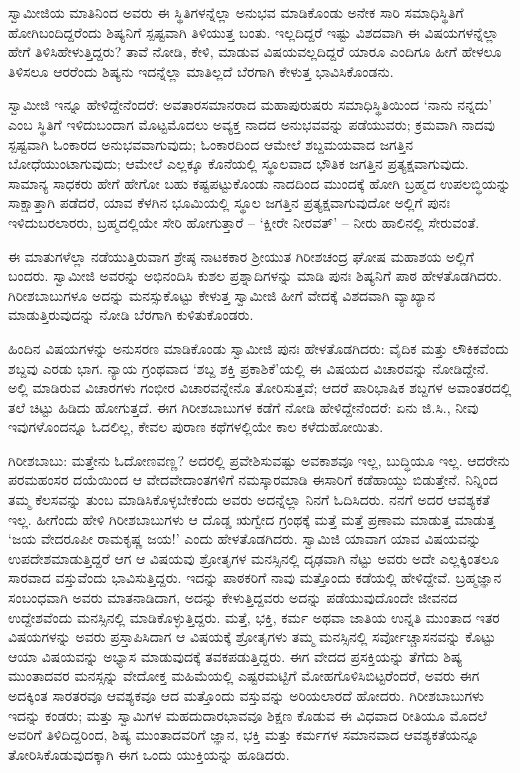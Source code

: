 ಸ್ವಾಮೀಜಿಯ ಮಾತಿನಿಂದ ಅವರು ಈ ಸ್ಥಿತಿಗಳನ್ನೆಲ್ಲಾ ಅನುಭವ ಮಾಡಿಕೊಂಡು ಅನೇಕ ಸಾರಿ ಸಮಾಧಿಸ್ಥಿತಿಗೆ ಹೋಗಿಬಂದಿದ್ದರೆಂದು ಶಿಷ್ಯನಿಗೆ ಸ್ಪಷ್ಟವಾಗಿ ತಿಳಿಯುತ್ತ ಬಂತು. ಇಲ್ಲದಿದ್ದರೆ ಇಷ್ಟು ವಿಶದವಾಗಿ ಈ ವಿಷಯಗಳನ್ನೆಲ್ಲಾ ಹೇಗೆ ತಿಳಿಸಿಹೇಳುತ್ತಿದ್ದರು? ತಾವೆ ನೋಡಿ, ಕೇಳಿ, ಮಾಡುವ ವಿಷಯವಲ್ಲದಿದ್ದರೆ ಯಾರೂ ಎಂದಿಗೂ ಹೀಗೆ ಹೇಳಲೂ ತಿಳಿಸಲೂ ಆರರೆಂದು ಶಿಷ್ಯನು ಇದನ್ನೆಲ್ಲಾ ಮಾತಿಲ್ಲದೆ ಬೆರಗಾಗಿ ಕೇಳುತ್ತ ಭಾವಿಸಿಕೊಂಡನು.

ಸ್ವಾಮೀಜಿ ಇನ್ನೂ ಹೇಳಿದ್ದೇನೆಂದರೆ: ಅವತಾರಸಮಾನರಾದ ಮಹಾಪುರುಷರು ಸಮಾಧಿಸ್ಥಿತಿಯಿಂದ ‘ನಾನು ನನ್ನದು’ ಎಂಬ ಸ್ಥಿತಿಗೆ ಇಳಿದುಬಂದಾಗ ಮೊಟ್ಟಮೊದಲು ಅವ್ಯಕ್ತ ನಾದದ ಅನುಭವವನ್ನು ಪಡೆಯುವರು; ಕ್ರಮವಾಗಿ ನಾದವು ಸ್ಪಷ್ಟವಾಗಿ ಓಂಕಾರದ ಅನುಭವವಾಗುವುದು; ಓಂಕಾರದಿಂದ ಆಮೇಲೆ ಶಬ್ದಮಯವಾದ ಜಗತ್ತಿನ ಬೋಧೆಯುಂಟಾಗುವುದು; ಆಮೇಲೆ ಎಲ್ಲಕ್ಕೂ ಕೊನೆಯಲ್ಲಿ ಸ್ಥೂಲವಾದ ಭೌತಿಕ ಜಗತ್ತಿನ ಪ್ರತ್ಯಕ್ಷವಾಗುವುದು. ಸಾಮಾನ್ಯ ಸಾಧಕರು ಹೇಗೆ ಹೇಗೋ ಬಹು ಕಷ್ಟಪಟ್ಟುಕೊಂಡು ನಾದದಿಂದ ಮುಂದಕ್ಕೆ ಹೋಗಿ ಬ್ರಹ್ಮದ ಉಪಲಬ್ಧಿಯನ್ನು ಸಾಕ್ಷಾತ್ತಾಗಿ ಪಡೆದರೆ, ಯಾವ ಕೆಳಗಿನ ಭೂಮಿಯಲ್ಲಿ ಸ್ಥೂಲ ಜಗತ್ತಿನ ಪ್ರತ್ಯಕ್ಷವಾಗುವುದೋ ಅಲ್ಲಿಗೆ ಪುನಃ ಇಳಿದುಬರಲಾರರು, ಬ್ರಹ್ಮದಲ್ಲಿಯೇ ಸೇರಿ ಹೋಗುತ್ತಾರೆ – ‘ಕ್ಷೀರೇ ನೀರವತ್’ – ನೀರು ಹಾಲಿನಲ್ಲಿ ಸೇರುವಂತೆ.

ಈ ಮಾತುಗಳೆಲ್ಲಾ ನಡೆಯುತ್ತಿರುವಾಗ ಶ್ರೇಷ್ಠ ನಾಟಕಕಾರ ಶ‍್ರೀಯುತ ಗಿರೀಶಚಂದ್ರ ಘೋಷ ಮಹಾಶಯ ಅಲ್ಲಿಗೆ ಬಂದರು. ಸ್ವಾಮೀಜಿ ಅವರನ್ನು ಅಭಿನಂದಿಸಿ ಕುಶಲ ಪ್ರಶ್ನಾದಿಗಳನ್ನು ಮಾಡಿ ಪುನಃ ಶಿಷ್ಯನಿಗೆ ಪಾಠ ಹೇಳತೊಡಗಿದರು. ಗಿರೀಶಬಾಬುಗಳೂ ಅದನ್ನು ಮನಸ್ಸುಕೊಟ್ಟು ಕೇಳುತ್ತ ಸ್ವಾಮೀಜಿ ಹೀಗೆ ವೇದಕ್ಕೆ ವಿಶದವಾಗಿ ವ್ಯಾಖ್ಯಾನ ಮಾಡುತ್ತಿರುವುದನ್ನು ನೋಡಿ ಬೆರಗಾಗಿ ಕುಳಿತುಕೊಂಡರು.

ಹಿಂದಿನ ವಿಷಯಗಳನ್ನು ಅನುಸರಣ ಮಾಡಿಕೊಂಡು ಸ್ವಾಮೀಜಿ ಪುನಃ ಹೇಳತೊಡಗಿದರು: ವೈದಿಕ ಮತ್ತು ಲೌಕಿಕವೆಂದು ಶಬ್ದವು ಎರಡು ಭಾಗ. ನ್ಯಾಯ ಗ್ರಂಥವಾದ ‘ಶಬ್ದ ಶಕ್ತಿ ಪ್ರಕಾಶಿಕೆ’ಯಲ್ಲಿ ಈ ವಿಷಯದ ವಿಚಾರವನ್ನು ನೋಡಿದ್ದೇನೆ. ಅಲ್ಲಿ ಮಾಡಿರುವ ವಿಚಾರಗಳು ಗಂಭೀರ ವಿಚಾರವನ್ನೇನೊ ತೋರಿಸುತ್ತವೆ; ಆದರೆ ಪಾರಿಭಾಷಿಕ ಶಬ್ದಗಳ ಅವಾಂತರದಲ್ಲಿ ತಲೆ ಚಿಟ್ಟು ಹಿಡಿದು ಹೋಗುತ್ತದೆ. ಈಗ ಗಿರೀಶಬಾಬುಗಳ ಕಡೆಗೆ ನೋಡಿ ಹೇಳಿದ್ದೇನೆಂದರೆ: ಏನು ಜಿ.ಸಿ., ನೀವು ಇವುಗಳೊಂದನ್ನೂ ಓದಲಿಲ್ಲ, ಕೇವಲ ಪುರಾಣ ಕಥೆಗಳಲ್ಲಿಯೇ ಕಾಲ ಕಳೆದುಹೋಯಿತು.

ಗಿರೀಶಬಾಬು: ಮತ್ತೇನು ಓದೋಣವಣ್ಣ? ಅದರಲ್ಲಿ ಪ್ರವೇಶಿಸುವಷ್ಟು ಅವಕಾಶವೂ ಇಲ್ಲ, ಬುದ್ಧಿಯೂ ಇಲ್ಲ. ಆದರೇನು ಪರಮಹಂಸರ ದಯೆಯಿಂದ ಆ ವೇದವೇದಾಂತಗಳಿಗೆ ನಮಸ್ಕಾರಮಾಡಿ ಈಸಾರಿಗೆ ಕಡೆಹಾಯ್ದು ಬಿಡುತ್ತೇನೆ. ನಿನ್ನಿಂದ ತಮ್ಮ ಕೆಲಸವನ್ನು ತುಂಬ ಮಾಡಿಸಿಕೊಳ್ಳಬೇಕೆಂದು ಅವರು ಅದನ್ನೆಲ್ಲಾ ನಿನಗೆ ಓದಿಸಿದರು. ನನಗೆ ಅದರ ಆವಶ್ಯಕತೆ ಇಲ್ಲ. ಹೀಗೆಂದು ಹೇಳಿ ಗಿರೀಶಬಾಬುಗಳು ಆ ದೊಡ್ಡ ಋಗ್ವೇದ ಗ್ರಂಥಕ್ಕೆ ಮತ್ತೆ ಮತ್ತೆ ಪ್ರಣಾಮ ಮಾಡುತ್ತ ಮಾಡುತ್ತ ‘ಜಯ ವೇದರೂಪೀ ರಾಮಕೃಷ್ಣ ಜಯ!’ ಎಂದು ಹೇಳತೊಡಗಿದರು. ಸ್ವಾಮಿಜಿ ಯಾವಾಗ ಯಾವ ವಿಷಯವನ್ನು ಉಪದೇಶಮಾಡುತ್ತಿದ್ದರೆ ಆಗ ಆ ವಿಷಯವು ಶ್ರೋತೃಗಳ ಮನಸ್ಸಿನಲ್ಲಿ ದೃಢವಾಗಿ ನೆಟ್ಟು ಅವರು ಅದೇ ಎಲ್ಲಕ್ಕಿಂತಲೂ ಸಾರವಾದ ವಸ್ತುವೆಂದು ಭಾವಿಸುತ್ತಿದ್ದರು. ಇದನ್ನು ಪಾಠಕರಿಗೆ ನಾವು ಮತ್ತೊಂದು ಕಡೆಯಲ್ಲಿ ಹೇಳಿದ್ದೇವೆ. ಬ್ರಹ್ಮಜ್ಞಾನ ಸಂಬಂಧವಾಗಿ ಅವರು ಮಾತನಾಡಿದಾಗ, ಅದನ್ನು ಕೇಳುತ್ತಿದ್ದವರು ಅದನ್ನು ಪಡೆಯುವುದೊಂದೇ ಜೀವನದ ಉದ್ದೇಶವೆಂದು ಮನಸ್ಸಿನಲ್ಲಿ ಮಾಡಿಕೊಳ್ಳುತ್ತಿದ್ದರು. ಮತ್ತೆ, ಭಕ್ತಿ, ಕರ್ಮ ಅಥವಾ ಜಾತಿಯ ಉನ್ನತಿ ಮುಂತಾದ ಇತರ ವಿಷಯಗಳನ್ನು ಅವರು ಪ್ರಸ್ತಾಪಿಸಿದಾಗ ಆ ವಿಷಯಕ್ಕೆ ಶ್ರೋತೃಗಳು ತಮ್ಮ ಮನಸ್ಸಿನಲ್ಲಿ ಸರ್ವೋಚ್ಚಾಸನವನ್ನು ಕೊಟ್ಟು ಆಯಾ ವಿಷಯವನ್ನು ಅಭ್ಯಾಸ ಮಾಡುವುದಕ್ಕೆ ತವಕಪಡುತ್ತಿದ್ದರು. ಈಗ ವೇದದ ಪ್ರಸಕ್ತಿಯನ್ನು ತೆಗೆದು ಶಿಷ್ಯ ಮುಂತಾದವರ ಮನಸ್ಸನ್ನು ವೇದೋಕ್ತ ಮಹಿಮೆಯಲ್ಲಿ ಎಷ್ಟರಮಟ್ಟಿಗೆ ಮೋಹಗೊಳಿಸಿಬಿಟ್ಟರೆಂದರೆ, ಅವರು ಈಗ ಅದಕ್ಕಿಂತ ಸಾರತರವೂ ಆವಶ್ಯಕವೂ ಆದ ಮತ್ತೊಂದು ವಸ್ತುವನ್ನು ಅರಿಯಲಾರದೆ ಹೋದರು. ಗಿರೀಶಬಾಬುಗಳು ಇದನ್ನು ಕಂಡರು; ಮತ್ತು ಸ್ವಾಮಿಗಳ ಮಹದುದಾರಭಾವವೂ ಶಿಕ್ಷಣ ಕೊಡುವ ಈ ವಿಧವಾದ ರೀತಿಯೂ ಮೊದಲೆ ಅವರಿಗೆ ತಿಳಿದಿದ್ದರಿಂದ, ಶಿಷ್ಯ ಮುಂತಾದವರಿಗೆ ಜ್ಞಾನ, ಭಕ್ತಿ ಮತ್ತು ಕರ್ಮಗಳ ಸಮಾನವಾದ ಆವಶ್ಯಕತೆಯನ್ನೂ ತೋರಿಸಿಕೊಡುವುದಕ್ಕಾಗಿ ಈಗ ಒಂದು ಯುಕ್ತಿಯನ್ನು ಹೂಡಿದರು.

